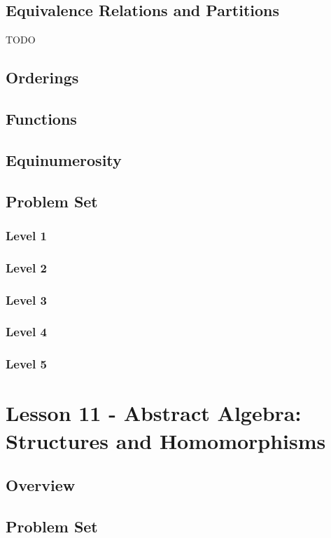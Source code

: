 \documentclass{article}
\begin{document}
\subsection{Equivalence Relations and Partitions}

TODO

\subsection{Orderings}
\subsection{Functions}
\subsection{Equinumerosity}
\subsection{Problem Set}
\subsubsection{Level 1}
\subsubsection{Level 2}
\subsubsection{Level 3}
\subsubsection{Level 4}
\subsubsection{Level 5}
\pagebreak

\section{Lesson 11 - Abstract Algebra: Structures and Homomorphisms}
\subsection{Overview}
\subsection{Problem Set}
\end{document}
